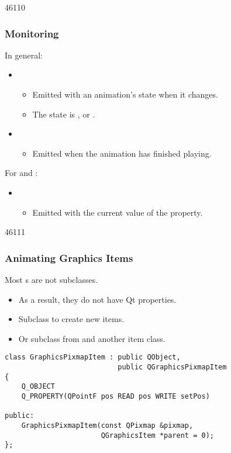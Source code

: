 \begin{slide}{46110}\frametitle{Monitoring}
\vspace*{1.5em}

In general:
\begin{itemize}
\item {}
\begin{itemize}
\item Emitted with an animation's state when it changes.
\item The state is ,
 or .
\end{itemize}
\item {}
\begin{itemize}
\item Emitted when the animation has finished playing.
\end{itemize}
\end{itemize}

For  and :
\begin{itemize}
\item {}
\begin{itemize}
\item Emitted with the current value of the property.
\end{itemize}
\end{itemize}

\end{slide}


\begin{slide}[fragile]{46111}\frametitle{Animating Graphics Items}
\label{Animation-Graphics-Items}

Most s are not  subclasses.
\begin{itemize}
\item As a result, they do not have Qt properties.
\item Subclass  to create new items.
\item Or subclass from  and another item class.
\end{itemize}
\small
\begin{lstlisting}
class GraphicsPixmapItem : public QObject,
                           public QGraphicsPixmapItem
{
    Q_OBJECT
    Q_PROPERTY(QPointF pos READ pos WRITE setPos)

public:
    GraphicsPixmapItem(const QPixmap &pixmap,
                       QGraphicsItem *parent = 0);
};
\end{lstlisting}
\normalsize
{}
\end{slide}


